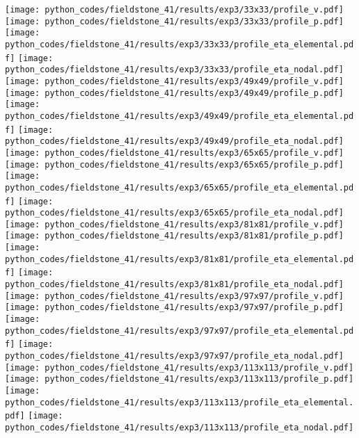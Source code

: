 \begin{center}
\texttt{[image: python\_codes/fieldstone\_41/results/exp3/33x33/profile\_v.pdf]}
\texttt{[image: python\_codes/fieldstone\_41/results/exp3/33x33/profile\_p.pdf]}
\texttt{[image: python\_codes/fieldstone\_41/results/exp3/33x33/profile\_eta\_elemental.pdf]}
\texttt{[image: python\_codes/fieldstone\_41/results/exp3/33x33/profile\_eta\_nodal.pdf]}\\
\texttt{[image: python\_codes/fieldstone\_41/results/exp3/49x49/profile\_v.pdf]}
\texttt{[image: python\_codes/fieldstone\_41/results/exp3/49x49/profile\_p.pdf]}
\texttt{[image: python\_codes/fieldstone\_41/results/exp3/49x49/profile\_eta\_elemental.pdf]}
\texttt{[image: python\_codes/fieldstone\_41/results/exp3/49x49/profile\_eta\_nodal.pdf]}\\
\texttt{[image: python\_codes/fieldstone\_41/results/exp3/65x65/profile\_v.pdf]}
\texttt{[image: python\_codes/fieldstone\_41/results/exp3/65x65/profile\_p.pdf]}
\texttt{[image: python\_codes/fieldstone\_41/results/exp3/65x65/profile\_eta\_elemental.pdf]}
\texttt{[image: python\_codes/fieldstone\_41/results/exp3/65x65/profile\_eta\_nodal.pdf]}\\
\texttt{[image: python\_codes/fieldstone\_41/results/exp3/81x81/profile\_v.pdf]}
\texttt{[image: python\_codes/fieldstone\_41/results/exp3/81x81/profile\_p.pdf]}
\texttt{[image: python\_codes/fieldstone\_41/results/exp3/81x81/profile\_eta\_elemental.pdf]}
\texttt{[image: python\_codes/fieldstone\_41/results/exp3/81x81/profile\_eta\_nodal.pdf]}\\
\texttt{[image: python\_codes/fieldstone\_41/results/exp3/97x97/profile\_v.pdf]}
\texttt{[image: python\_codes/fieldstone\_41/results/exp3/97x97/profile\_p.pdf]}
\texttt{[image: python\_codes/fieldstone\_41/results/exp3/97x97/profile\_eta\_elemental.pdf]}
\texttt{[image: python\_codes/fieldstone\_41/results/exp3/97x97/profile\_eta\_nodal.pdf]}\\
\texttt{[image: python\_codes/fieldstone\_41/results/exp3/113x113/profile\_v.pdf]}
\texttt{[image: python\_codes/fieldstone\_41/results/exp3/113x113/profile\_p.pdf]}
\texttt{[image: python\_codes/fieldstone\_41/results/exp3/113x113/profile\_eta\_elemental.pdf]}
\texttt{[image: python\_codes/fieldstone\_41/results/exp3/113x113/profile\_eta\_nodal.pdf]}\\

\end{center}
